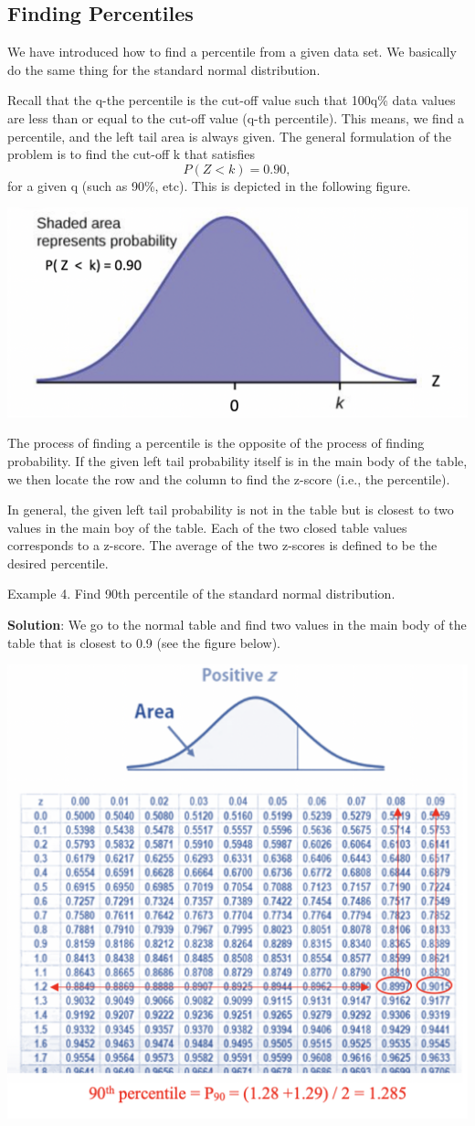 \documentclass[
]{book}
\begin{document}
\hypertarget{finding-percentiles}{%
\subsection{Finding Percentiles}\label{finding-percentiles}}

We have introduced how to find a percentile from a given data set. We basically do the same thing for the standard normal distribution.

Recall that the q-the percentile is the cut-off value such that 100q\% data values are less than or equal to the cut-off value (q-th percentile). This means, we find a percentile, and the left tail area is always given. The general formulation of the problem is to find the cut-off k that satisfies
\[
P(Z < k) = 0.90,
\]
for a given q (such as 90\%, etc). This is depicted in the following figure.

\begin{center}\includegraphics[width=0.6\linewidth]{week04/findingPercentile} \end{center}

The process of finding a percentile is the opposite of the process of finding probability. If the given left tail probability itself is in the main body of the table, we then locate the row and the column to find the z-score (i.e., the percentile).

In general, the given left tail probability is not in the table but is closest to two values in the main boy of the table. Each of the two closed table values corresponds to a z-score. The average of the two z-scores is defined to be the desired percentile.

Example 4. Find 90th percentile of the standard normal distribution.

\textbf{Solution}: We go to the normal table and find two values in the main body of the table that is closest to 0.9 (see the figure below).

\begin{center}\includegraphics[width=0.6\linewidth]{week04/finding90thPercentile} \end{center}
\end{document}
